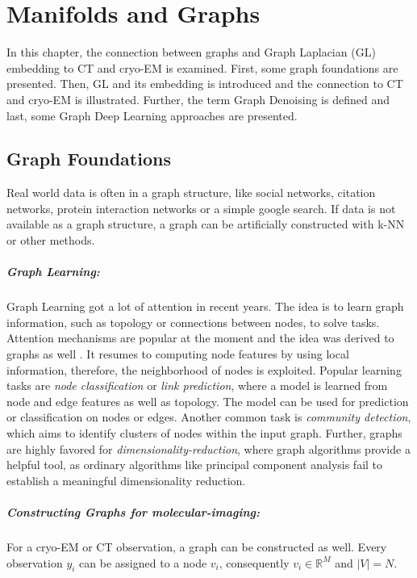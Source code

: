 \chapter{Manifolds and Graphs}
\label{sec:manifold_and_graphs}
    
In this chapter, the connection between graphs and Graph Laplacian (GL) embedding to 
CT and cryo-EM is examined. 
First, some graph foundations are presented.
Then, GL and its embedding is introduced and the connection to CT and cryo-EM is illustrated.
Further, the term Graph Denoising is defined and last, some Graph Deep Learning approaches are presented.


\section{Graph Foundations}
Real world data is often in a graph structure, like social networks, citation networks,
protein interaction networks or a simple google search. 
If data is not available as a graph structure, a graph can be artificially constructed with k-NN or other methods.

\paragraph{Graph Learning:} 
Graph Learning got a lot of attention in recent years.
The idea is to learn graph information, such as topology or connections between nodes, to solve tasks.
Attention mechanisms are popular at the moment\cite{transformer} and the idea was derived to graphs as well \cite{GAT}.
It resumes to computing node features by using local information, therefore, the neighborhood of nodes is exploited.
Popular learning tasks are \textit{node classification} or \textit{link prediction}, where a model is learned from node and edge features 
as well as topology. The model can be used for prediction or classification on nodes or edges.
Another common task is \textit{community detection}, which aims to identify clusters of nodes within the input graph.
Further, graphs are highly favored for \textit{dimensionality-reduction}, where 
graph algorithms provide a helpful tool, as ordinary algorithms like principal component analysis fail to 
establish a meaningful dimensionality reduction.


\paragraph{Constructing Graphs for molecular-imaging:}
For a cryo-EM or CT observation, a graph can be constructed as well.
Every observation $y_i$ can be assigned to a node $v_i$, consequently $v_i \in \mathbb{R}^M$ and $|V|=N$.

